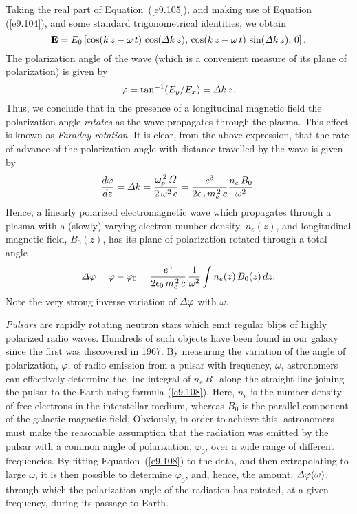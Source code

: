 Taking the real part of Equation~(\ref{e9.105}), and making use of Equation
 (\ref{e9.104}), and some standard trigonometrical identities,
we obtain
\begin{equation}
{\bf E} =E_0 \left[\cos(k\,z-\omega\,t)\,\cos({\mit\Delta} k\,z),\,
\cos(k\,z-\omega\,t)\,\sin({\mit\Delta} k\,z),\, 0\right].
\end{equation}
The polarization angle of the wave (which is a convenient measure of
its plane of polarization) is given by
\begin{equation}
\varphi = \tan^{-1}(E_y/E_x) = {\mit\Delta}k\,z.
\end{equation}
Thus, we conclude that in the presence of a longitudinal magnetic field
the polarization angle  {\em rotates} as the wave propagates through the plasma. This effect is
known as {\em Faraday rotation}. It is clear, from the above expression,
that the rate of advance of the polarization angle with distance
travelled by the wave is given by
\begin{equation}
\frac{d\varphi}{dz} = {\mit\Delta}k = \frac{\omega_p^{\,2}\,{\mit\Omega}}{2\,\omega^2\,c} = \frac{e^3}{2\epsilon_0\,m_e^{\,2}\,c}\frac{n_e\,B_0}{\omega^2}.
\end{equation}
Hence, a linearly polarized electromagnetic wave which propagates through a
plasma with a (slowly) varying electron number density, $n_e(z)$, 
and longitudinal magnetic field, $B_0(z)$, has its plane of
polarization rotated through a total angle
\begin{equation}\label{e9.108}
{\mit\Delta}\varphi = \varphi - \varphi_0=\frac{e^3}{2\epsilon_0\,m_e^{\,2}\,c}\,\frac{1}{\omega^2}
\int n_e(z)\,B_0(z)\,dz.
\end{equation}
Note the very strong inverse variation of ${\mit\Delta}\varphi$ with $\omega$.

{\em Pulsars} are rapidly rotating neutron stars which emit regular blips of
highly polarized radio waves. Hundreds of such objects have been found
in our galaxy since the first was discovered in 1967. By measuring
the variation of the angle of polarization, $\varphi$, of radio emission from a pulsar with frequency, $\omega$, astronomers can effectively determine
the line integral of $n_e\,B_0$ along the straight-line joining the
pulsar to the Earth using formula (\ref{e9.108}). Here, $n_e$ is the number
density of free electrons in the interstellar medium, whereas $B_0$
is the parallel component of the galactic magnetic field. Obviously, in order
to achieve this, astronomers must make the reasonable assumption that the
radiation was emitted by the pulsar with a common angle of polarization, $\varphi_0$,
over a wide range of different frequencies. By fitting Equation~(\ref{e9.108})
to the data, and then extrapolating to large $\omega$, it is then possible to
determine  $\varphi_0$, and, hence, the amount, ${\mit\Delta}\varphi(\omega)$, 
through which the polarization angle of the radiation has rotated, at a given frequency, during its passage to Earth.

